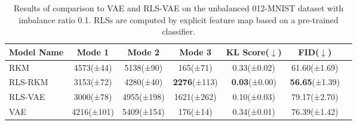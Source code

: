 \begin{table}[ht]
\centering
\begin{tabular}{lcccccc}
\toprule
Model Name & Mode 1 & Mode 2 & \textbf{Mode 3} & KL Score($\downarrow$) & FID($\downarrow$) \\
\midrule
RKM & 4573(±44) & 5138(±90) & 165(±71) & 0.33(±0.02) & 61.60(±1.69) \\
RLS-RKM & 3153(±72) & 4280(±40) & \textbf{2276}(±113) & \textbf{0.03}(±0.00) & \textbf{56.65}(±1.39) \\
RLS-VAE & 3000(±78) & 4955(±198) & 1621(±262) & 0.10(±0.03) & 79.17(±2.70) \\
VAE & 4216(±101) & 5409(±154) & 176(±14) & 0.34(±0.01) & 76.39(±1.42) \\
\bottomrule
\end{tabular}
\caption{Results of comparison to VAE and RLS-VAE on the unbalanced 012-MNIST dataset with imbalance ratio 0.1. RLSs are computed by explicit feature map based on a pre-trained classifier.}
\label{expr-comparison-vae}
\end{table}